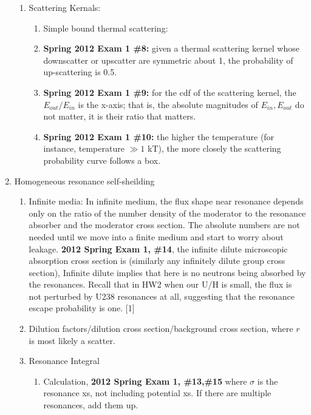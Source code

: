 \documentclass{school-22.211-notes}
\begin{document}
\begin{enumerate}
\begin{enumerate}
    \item Scattering Kernals: 
      \begin{enumerate}
      \item Simple bound thermal scattering: 
      \item \textbf{Spring 2012 Exam 1 \#8:} given a thermal scattering kernel whose downscatter or upscatter are symmetric about 1, the probability of up-scattering is 0.5. 
      \item \textbf{Spring 2012 Exam 1 \#9:} for the cdf of the scattering kernel, the $E_{out}/E_{in}$ is the x-axis; that is, the absolute magnitudes of $E_{in}, E_{out}$ do not matter, it is their ratio that matters. 
      \item \textbf{Spring 2012 Exam 1 \#10:} the higher the temperature (for instance, temperature $\gg 1$ kT), the more closely the scattering probability curve follows a box. 
      \end{enumerate}
  \end{enumerate}

\item Homogeneous resonance self-sheilding
  \begin{enumerate}
    \item Infinite media: In infinite medium, the flux shape near resonance depends only on the ratio of the number density of the moderator to the resonance absorber and the moderator cross section. The absolute numbers are not needed until we move into a finite medium and start to worry about leakage. \textbf{2012 Spring Exam 1, \#14}, the infinite dilute microscopic absorption cross section is (similarly any infinitely dilute group cross section), 
      Infinite dilute implies that here is no neutrons being absorbed by the resonances. Recall that in HW2 when our U/H is small, the flux is not perturbed by U238 resonances at all, suggesting that the resonance escape probability is one. [1]
    \item Dilution factors/dilution cross section/background cross section, 
      where $r$ is most likely a scatter. 

    \item Resonance Integral
      \begin{enumerate}
      \item Calculation, \textbf{2012 Spring Exam 1, \#13,\#15}
        where $\sigma$ is the resonance xs, not including potential xs. If there are multiple resonances, add them up. 


\end{enumerate}
\end{enumerate}
\end{enumerate}
\end{document}
